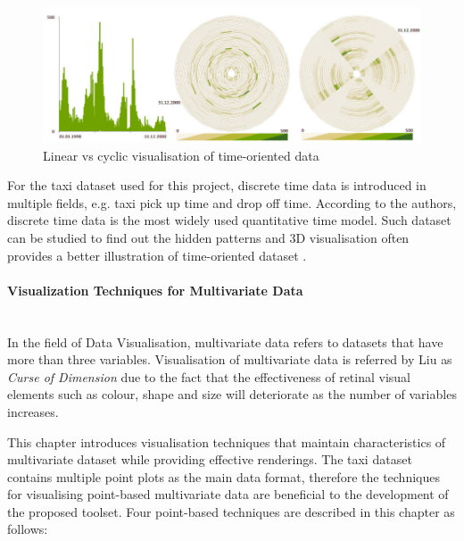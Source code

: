 \documentclass[11pt,a4paper]{article}
\begin{document}
\begin{figure}[H]
	\centering
	\includegraphics[width=\textwidth,keepaspectratio]{figures/fig3.png}
	\caption{\label{fig:3}Linear vs cyclic visualisation of time-oriented data \parencite[p. 255]{Ward2010}}
\end{figure}

For the taxi dataset used for this project, discrete time data is introduced in multiple fields, e.g. taxi pick up time and drop off time. According to the authors, discrete time data is the most widely used quantitative time model. Such dataset can be studied to find out the hidden patterns and 3D visualisation often provides a better illustration of time-oriented dataset \parencite[pp. 258-263]{Ward2010}.

\paragraph{Visualization Techniques for Multivariate Data}\hfil\\
In the field of Data Visualisation, multivariate data refers to datasets that have more than three variables. Visualisation of multivariate data is referred by Liu \parencite{Liu} as \textit{Curse of Dimension} due to the fact that the effectiveness of retinal visual elements such as colour, shape and size will deteriorate as the number of variables increases.

This chapter introduces visualisation techniques that maintain characteristics of multivariate dataset while providing effective renderings. The taxi dataset contains multiple point plots as the main data format, therefore the techniques for visualising point-based multivariate data are beneficial to the development of the proposed toolset. Four point-based techniques are described \parencite[pp. 285-292]{Ward2010} in this chapter as follows:
\end{document}
